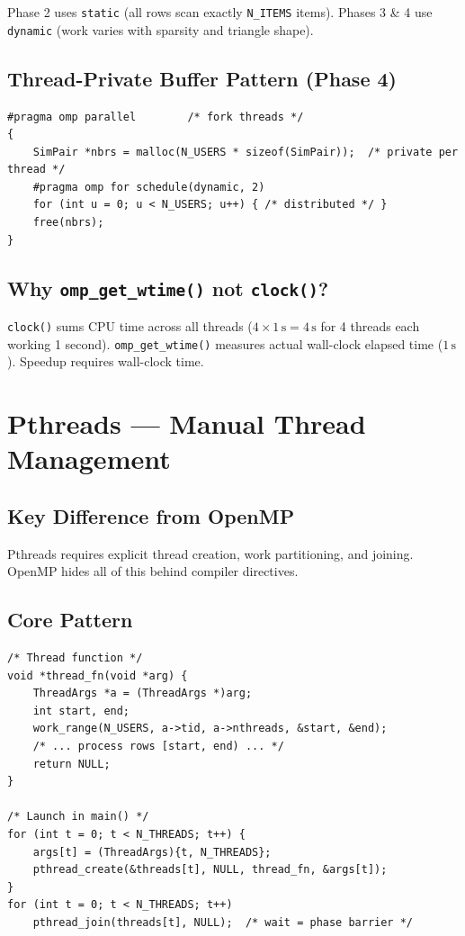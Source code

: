 \documentclass[12pt,a4paper]{report}
\begin{document}
Phase 2 uses \texttt{static} (all rows scan exactly \texttt{N\_ITEMS} items).
Phases 3 \& 4 use \texttt{dynamic} (work varies with sparsity and triangle shape).

\section{Thread-Private Buffer Pattern (Phase 4)}

\begin{lstlisting}
#pragma omp parallel        /* fork threads */
{
    SimPair *nbrs = malloc(N_USERS * sizeof(SimPair));  /* private per thread */
    #pragma omp for schedule(dynamic, 2)
    for (int u = 0; u < N_USERS; u++) { /* distributed */ }
    free(nbrs);
}
\end{lstlisting}

\section{Why \texttt{omp\_get\_wtime()} not \texttt{clock()}?}

\texttt{clock()} sums CPU time across all threads ($4 \times 1\,\text{s} = 4\,\text{s}$
for 4 threads each working 1 second).  \texttt{omp\_get\_wtime()} measures
actual wall-clock elapsed time ($1\,\text{s}$).  Speedup requires wall-clock time.

\chapter{Pthreads — Manual Thread Management}

\section{Key Difference from OpenMP}

Pthreads requires explicit thread creation, work partitioning, and joining.
OpenMP hides all of this behind compiler directives.

\section{Core Pattern}

\begin{lstlisting}
/* Thread function */
void *thread_fn(void *arg) {
    ThreadArgs *a = (ThreadArgs *)arg;
    int start, end;
    work_range(N_USERS, a->tid, a->nthreads, &start, &end);
    /* ... process rows [start, end) ... */
    return NULL;
}

/* Launch in main() */
for (int t = 0; t < N_THREADS; t++) {
    args[t] = (ThreadArgs){t, N_THREADS};
    pthread_create(&threads[t], NULL, thread_fn, &args[t]);
}
for (int t = 0; t < N_THREADS; t++)
    pthread_join(threads[t], NULL);  /* wait = phase barrier */
\end{lstlisting}
\end{document}
